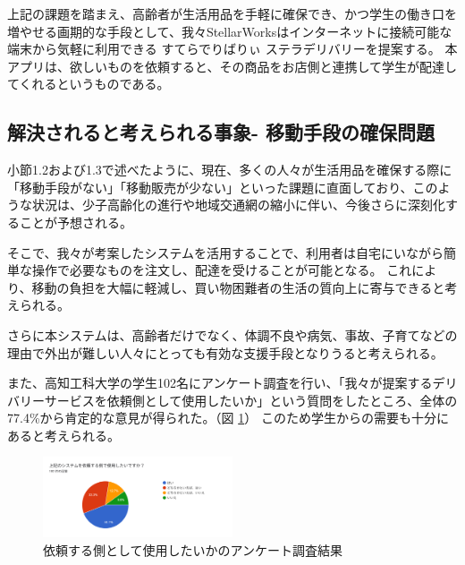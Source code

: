 上記の課題を踏まえ、高齢者が生活用品を手軽に確保でき、かつ学生の働き口を増やせる画期的な手段として、我々StellarWorksはインターネットに接続可能な端末から気軽に利用できる すてらでりばりぃ ステラデリバリーを提案する。
本アプリは、欲しいものを依頼すると、その商品をお店側と連携して学生が配達してくれるというものである。

\subsection{解決されると考えられる事象- 移動手段の確保問題}

小節1.2および1.3で述べたように、現在、多くの人々が生活用品を確保する際に「移動手段がない」「移動販売が少ない」といった課題に直面しており、このような状況は、少子高齢化の進行や地域交通網の縮小に伴い、今後さらに深刻化することが予想される。

そこで、我々が考案したシステムを活用することで、利用者は自宅にいながら簡単な操作で必要なものを注文し、配達を受けることが可能となる。
これにより、移動の負担を大幅に軽減し、買い物困難者の生活の質向上に寄与できると考えられる。

さらに本システムは、高齢者だけでなく、体調不良や病気、事故、子育てなどの理由で外出が難しい人々にとっても有効な支援手段となりうると考えられる。 

また、高知工科大学の学生102名にアンケート調査を行い、「我々が提案するデリバリーサービスを依頼側として使用したいか」という質問をしたところ、全体の77.4\%から肯定的な意見が得られた。（図 \ref{fig:アンケート2}） 
このため学生からの需要も十分にあると考えられる。 

\begin{figure}[H]
  \centering
  \includegraphics[width=0.5\textwidth]{依頼する側として使用したいか_アンケート結果.png}
  \caption{依頼する側として使用したいかのアンケート調査結果}
  \label{fig:アンケート2}
\end{figure}





